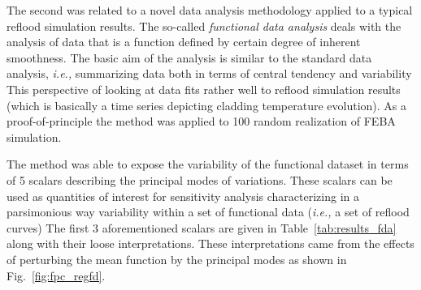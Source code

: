 \documentclass[11pt,titlepage]{article}
\begin{document}
The second was related to a novel data analysis methodology applied to a 
typical reflood simulation results.
The so-called \textit{functional data analysis} deals with the 
analysis of data that is a function defined by certain degree of inherent 
smoothness. 
The basic aim of the analysis is similar to the standard data analysis, 
\textit{i.e.,} summarizing data both in terms of central tendency and 
variability 
This perspective of looking at data fits rather well to reflood simulation 
results (which is basically a time series depicting cladding temperature 
evolution).
As a proof-of-principle the method was applied to 100 random realization 
of FEBA simulation.

The method was able to expose the variability of the functional dataset 
in terms of 5 scalars describing the principal modes of variations.
These scalars can be used as quantities of interest for sensitivity 
analysis characterizing in a parsimonious way variability within a 
set of functional data (\textit{i.e.,} a set of reflood curves)
The first 3 aforementioned scalars are given in Table~\ref{tab:results_fda} 
along with their loose interpretations. 
These interpretations came from the effects of perturbing the mean function 
by the principal modes as shown in Fig.~\ref{fig:fpc_regfd}.
    
\end{document}
